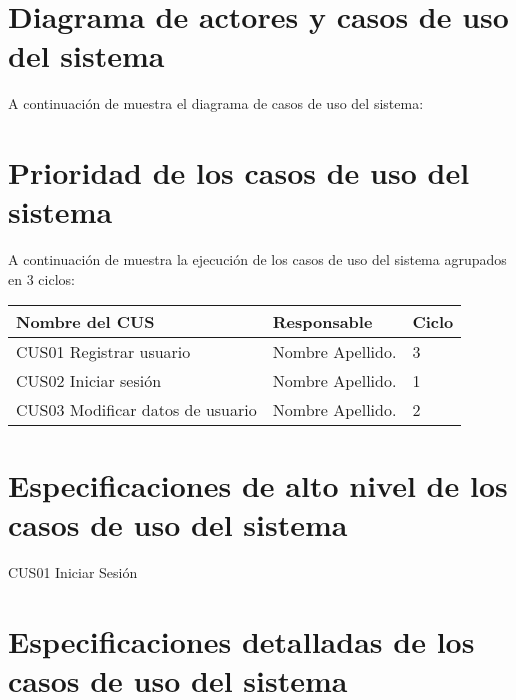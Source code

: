 \section{Diagrama de actores y casos de uso del sistema}

A continuación de muestra el diagrama de casos de uso del sistema:

 
\section{Prioridad de los casos de uso del sistema}

A continuación de muestra la ejecución de los casos de uso del sistema agrupados en 3 ciclos:
	\begin{table}[h!]	
		\begin{tabular}{ |p{4cm}|p{7cm}|p{3cm}| }	\hline
			
			\rowcolor{gray!50}  \textbf{Nombre del CUS}  &  \textbf{Responsable } &  \textbf{Ciclo} \\ \hline
			
			CUS01 Registrar usuario  &  Nombre Apellido. &  3   \\	\hline
			
			CUS02 Iniciar sesión  &  Nombre Apellido. &  1   \\	\hline
		
			CUS03 Modificar datos de usuario  &  Nombre Apellido. &  2   \\	\hline
			
		\end{tabular}
	\end{table}	


\section{Especificaciones de alto nivel de los casos de uso del sistema}

\begin{usecase}{CUS01 Iniciar Sesión}
\end{usecase}



\section{Especificaciones detalladas de los casos de uso del sistema}


